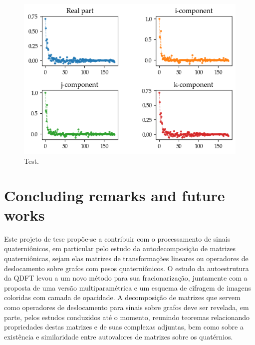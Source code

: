 \begin{figure}
	\centering
	\includegraphics[width=0.55\linewidth]{thesis/Figures/uk_graph_filtered.png}
	\caption{Test.}
	\label{fig:uk_graph_filtered}
\end{figure}

\chapter{Concluding remarks and future works}
\label{ch:conclusion}

Este projeto de tese prop\~oe-se a contribuir com o processamento de sinais quaterni\^onicos, em particular pelo estudo da autodecomposi\c c\~ao de matrizes quaterni\^onicas, sejam elas matrizes de transforma\c c\~oes lineares ou operadores de deslocamento sobre grafos com pesos quaterni\^onicos. O estudo da autoestrutura da QDFT levou a um novo m\'etodo para sua fracionariza\c c\~ao, juntamente com a proposta de uma vers\~ao multiparam\'etrica e um esquema de cifragem de imagens coloridas com camada de opacidade. A decomposi\c c\~ao de matrizes que servem como operadores de deslocamento para sinais sobre grafos deve ser revelada, em parte, pelos estudos conduzidos at\'e o momento, reunindo teoremas relacionando propriedades destas matrizes e de suas complexas adjuntas, bem como sobre a exist\^encia e similaridade entre autovalores de matrizes sobre os quat\'ernios.

